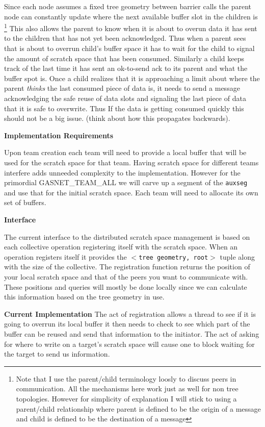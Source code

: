 \documentclass[times,10pt]{article}
\begin{document}
Since each node assumes a fixed tree geometry between barrier calls the parent node can constantly update where the next available buffer slot in the children is \footnote{Note that I use the parent/child terminology loosly to discuss peers in communication. All the mechanisms here work just as well for non tree topologies. However for simplicity of explanation I will stick to using a parent/child relationship where parent is defined to be the origin of a message and child is defined to be the destination of a message} This also allows the parent to know when it is about to overun data it has sent to the children that has not yet been acknowledged. Thus when a parent sees that is about to overrun child's buffer space it has to wait for the child to signal the amount of scratch space that has been consumed. Similarly a child keeps track of the last time it has sent an ok-to-send ack to its parent and what the buffer spot is. Once a child realizes that it is approaching a limit about where the parent \textit{thinks} the last consumed piece of data is, it needs to send a message acknowledging the safe reuse of data slots and signaling the last piece of data that it is safe to overwrite. Thus If the data is getting consumed quickly this should not be a big issue. (think about how this propagates backwards). 


\noindent \textbf{Implementation Requirements}

Upon team creation each team will  need to provide a local buffer that will be used for the scratch space for that team. Having scratch space for different teams interfere adds unneeded complexity to the implementation. However for the primordial GASNET\_TEAM\_ALL we will carve up a segment of the \texttt{auxseg} and use that for the initial scratch space. Each team will need to allocate its own set of buffers. 

\noindent \textbf{Interface}

The current interface to the distributed scratch space management is based on each collective operation registering itself with the scratch space. When an operation registers itself it provides the $<$\texttt{tree geometry, root}$>$ tuple along with the size of the collective. The registration function returns the position of your local scratch space and that of the peers you want to communicate with. These positions and queries will mostly be done locally since we can calculate this information based on the tree geometry in use.

\noindent \textbf{Current Implementation}
The act of registration allows a thread to see if it is going to overrun its local buffer it then needs to check to see which part of the buffer can be reused and send that information to the initiator. The act of asking for where to write on a target's scratch space will cause one to block waiting for the target to send us information.
 
\end{document}
